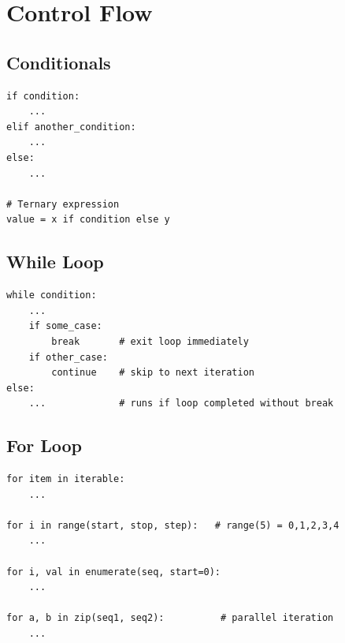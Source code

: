 \documentclass[oneside]{book}
\begin{document}

\section{Control Flow}

\subsection*{Conditionals}

\begin{codebox}
\begin{lstlisting}
if condition:
    ...
elif another_condition:
    ...
else:
    ...

# Ternary expression
value = x if condition else y
\end{lstlisting}
\end{codebox}

\subsection*{While Loop}

\begin{codebox}
\begin{lstlisting}
while condition:
    ...
    if some_case:
        break       # exit loop immediately
    if other_case:
        continue    # skip to next iteration
else:
    ...             # runs if loop completed without break
\end{lstlisting}
\end{codebox}

\subsection*{For Loop}

\begin{codebox}
\begin{lstlisting}
for item in iterable:
    ...

for i in range(start, stop, step):   # range(5) = 0,1,2,3,4
    ...

for i, val in enumerate(seq, start=0):
    ...

for a, b in zip(seq1, seq2):          # parallel iteration
    ...
\end{lstlisting}
\end{codebox}
\end{document}
